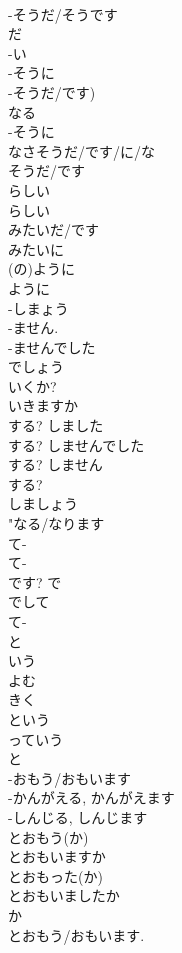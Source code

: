 \documentclass[8pt]{extreport}
\begin{document}
\begin{CJK}{UTF8}{min}
\\	-そうだ/そうです 
\\	だ 
\\	-い 
\\	-そうに 
\\	-そうだ/です)
\\	なる 
\\	-そうに 
\\	なさそうだ/です/に/な	
\\	そうだ/です 
\\	らしい 
\\	らしい 
\\	みたいだ/です	
\\	みたいに	
\\	(の)ように	
\\	ように 
\\	-しまょう			
\\	-ません. 
\\	-ませんでした			
\\	でしょう			
\\	いくか?			
\\	いきますか			
\\	する?	しました	
\\	する?	しませんでした	
\\	する?	しません	
\\	する?
\\	しましょう	
\\	"なる/なります
\\	て-
\\	て-
\\	です?	で 
\\	でして 
\\	て-
\\	と 
\\	いう 
\\	よむ 
\\	きく 
\\	という 
\\	っていう	
\\	と 
\\	-おもう/おもいます 
\\	-かんがえる, かんがえます 
\\	-しんじる, しんじます
\\	とおもう(か) 
\\	とおもいますか 
\\	とおもった(か) 
\\	とおもいましたか 
\\	か 
\\	とおもう/おもいます.

\end{CJK}
\end{document}
